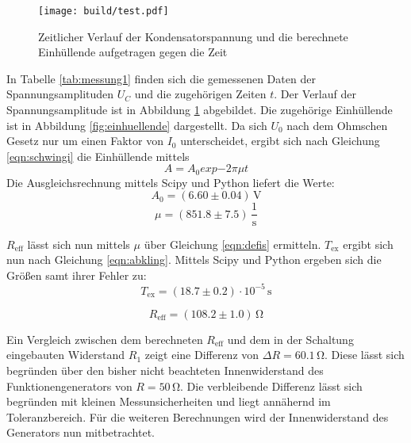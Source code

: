 \begin{figure}
	\centering
	\texttt{[image: build/test.pdf]}
	\caption{Zeitlicher Verlauf der Kondensatorspannung und die berechnete Einhüllende aufgetragen gegen die Zeit}
	\label{fig:spannungsamplitude}
\end{figure}

In Tabelle \ref{tab:messung1} finden sich die gemessenen Daten der Spannungsamplituden $U_C$ und die zugehörigen Zeiten $t$.
Der Verlauf der Spannungsamplitude ist in Abbildung \ref{fig:spannungsamplitude} abgebildet. Die zugehörige Einhüllende ist in Abbildung \ref{fig:einhuellende} dargestellt.
Da sich $U_\text{0}$ nach dem Ohmschen Gesetz nur um einen Faktor von $I_\text{0}$ unterscheidet, ergibt sich nach Gleichung \eqref{eqn:schwingi} die Einhüllende mittels
\begin{equation}
	A=A_\text{0}exp{-2 \pi \mu t}
\end{equation}
Die Ausgleichsrechnung mittels Scipy und Python liefert die Werte:
\begin{equation*}
	A_0 =  (6.60 \pm 0.04) \,\si{\volt}
\end{equation*}
\begin{equation*}
	\mu =  (851.8 \pm 7.5) \, \frac{1}{\si{\second}}
\end{equation*}

$R_\text{eff}$ lässt sich nun mittels $\mu$ über Gleichung \eqref{eqn:defis} ermitteln. $T_\text{ex}$ ergibt sich nun nach Gleichung \eqref{eqn:abkling}.
Mittels Scipy und Python ergeben sich die Größen samt ihrer Fehler zu:
\begin{equation*}
	T_{\text{ex}}=(18.7 \pm 0.2) \cdot 10^{-5}\,\si{\second}
\end{equation*}

\begin{equation*}
	R_{\text{eff}}= (108.2 \pm 1.0) \,\si{\ohm}
\end{equation*}

Ein Vergleich zwischen dem berechneten $R_\text{eff}$ und dem in der Schaltung eingebauten Widerstand $R_\text{1}$ zeigt eine Differenz von $\Delta R=60.1 \,\si{\ohm}$.
Diese lässt sich begründen über den bisher nicht beachteten Innenwiderstand des Funktionengenerators von $R=50\,\si{\ohm}$. Die verbleibende Differenz lässt sich begründen mit kleinen Messunsicherheiten und liegt annähernd im Toleranzbereich.
Für die weiteren Berechnungen wird der Innenwiderstand des Generators nun mitbetrachtet.

